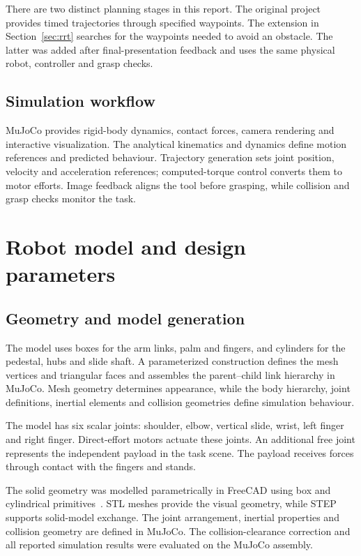 \documentclass[11pt,a4paper]{article}
\begin{document}
There are two distinct planning stages in this report. The original project
provides timed trajectories through specified waypoints. The extension in
Section~\ref{sec:rrt} searches for the waypoints needed to avoid an obstacle.
The latter was added after final-presentation feedback and uses the same
physical robot, controller and grasp checks.

\subsection{Simulation workflow}
MuJoCo provides rigid-body dynamics, contact forces, camera rendering and
interactive visualization. The analytical kinematics and dynamics define
motion references and predicted behaviour. Trajectory generation sets
joint position, velocity and acceleration references; computed-torque
control converts them to motor efforts. Image feedback aligns the tool
before grasping, while collision and grasp checks monitor the task.

\section{Robot model and design parameters}\label{sec:model}
\subsection{Geometry and model generation}
The model uses boxes for the arm links, palm and fingers, and cylinders for
the pedestal, hubs and slide shaft. A parameterized construction defines
the mesh vertices and triangular faces and assembles the parent--child
link hierarchy in MuJoCo. Mesh geometry determines
appearance, while the body hierarchy, joint definitions, inertial elements
and collision geometries define simulation behaviour.

The model has six scalar joints: shoulder, elbow, vertical slide, wrist,
left finger and right finger. Direct-effort motors actuate these joints.
An additional free joint represents the independent payload in the task
scene. The payload receives forces through contact with the fingers and
stands.

The solid geometry was modelled parametrically in FreeCAD using box and
cylindrical primitives~\cite{freecad}. STL meshes provide the visual
geometry, while STEP supports solid-model exchange. The joint arrangement,
inertial properties and collision geometry are defined in MuJoCo.
The collision-clearance correction and all reported simulation results
were evaluated on the MuJoCo assembly.
\end{document}
